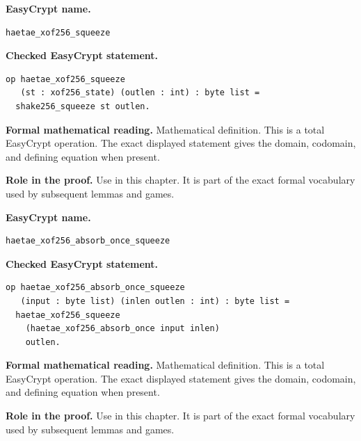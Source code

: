 \begin{formaldefinition}
\noindent\textbf{EasyCrypt name.}
\begin{lstlisting}[language=EasyCrypt,basicstyle=\ttfamily\scriptsize]
haetae_xof256_squeeze
\end{lstlisting}
\noindent\textbf{Checked EasyCrypt statement.}
\begin{lstlisting}[language=EasyCrypt,basicstyle=\ttfamily\scriptsize]
op haetae_xof256_squeeze
   (st : xof256_state) (outlen : int) : byte list =
  shake256_squeeze st outlen.
\end{lstlisting}
\noindent\textbf{Formal mathematical reading.}
Mathematical definition. This is a total EasyCrypt operation.  The exact displayed statement gives the domain, codomain, and defining equation when present.

\noindent\textbf{Role in the proof.}
Use in this chapter. It is part of the exact formal vocabulary used by subsequent lemmas and games.

\end{formaldefinition}

\begin{formaldefinition}
\noindent\textbf{EasyCrypt name.}
\begin{lstlisting}[language=EasyCrypt,basicstyle=\ttfamily\scriptsize]
haetae_xof256_absorb_once_squeeze
\end{lstlisting}
\noindent\textbf{Checked EasyCrypt statement.}
\begin{lstlisting}[language=EasyCrypt,basicstyle=\ttfamily\scriptsize]
op haetae_xof256_absorb_once_squeeze
   (input : byte list) (inlen outlen : int) : byte list =
  haetae_xof256_squeeze
    (haetae_xof256_absorb_once input inlen)
    outlen.
\end{lstlisting}
\noindent\textbf{Formal mathematical reading.}
Mathematical definition. This is a total EasyCrypt operation.  The exact displayed statement gives the domain, codomain, and defining equation when present.

\noindent\textbf{Role in the proof.}
Use in this chapter. It is part of the exact formal vocabulary used by subsequent lemmas and games.

\end{formaldefinition}

